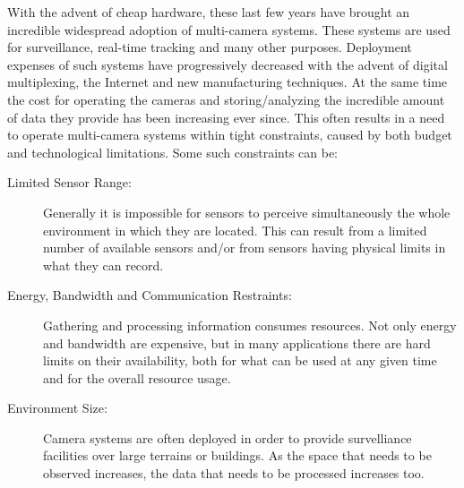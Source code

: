 
With the advent of cheap hardware, these last few years have brought an incredible widespread
adoption of multi-camera systems. These systems are used for surveillance, real-time tracking and
many other purposes. Deployment expenses of such systems have progressively decreased with the
advent of digital multiplexing, the Internet and new manufacturing techniques. At the same time the
cost for operating the cameras and storing/analyzing the incredible amount of data they provide has
been increasing ever since. This often results in a need to operate multi-camera systems within
tight constraints, caused by both budget and technological limitations. Some such constraints can
be:


\begin{description}

\item[Limited Sensor Range:] Generally it is impossible for sensors to perceive simultaneously the
    whole environment in which they are located. This can result from a limited number of available
    sensors and/or from sensors having physical limits in what they can record.

%

\item[Energy, Bandwidth and Communication Restraints:] Gathering and processing information consumes
    resources. Not only energy and bandwidth are expensive, but in many applications there are hard
    limits on their availability, both for what can be used at any given time and for the overall
    resource usage.

\item[Environment Size:] Camera systems are often deployed in order to provide survelliance
    facilities over large terrains or buildings. As the space that needs to be observed increases, the
    data that needs to be processed increases too.

\end{description}

